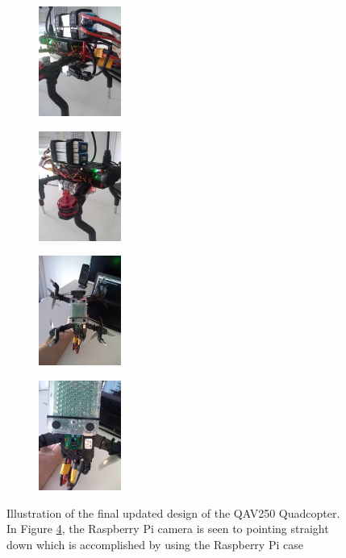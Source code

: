 \documentclass[../Head/report.tex]{subfiles}
\begin{document}
\begin{figure}[H]
    \centering
    \begin{subfigure}[b]{.20\textwidth}
        \centering
        \includegraphics[height=3.6cm]{../Figures/drone/drone_close1.jpg}
        \caption{}
        \label{fig:drone_close_one}
    \end{subfigure}
    \begin{subfigure}[b]{.20\textwidth}
        \centering
        \includegraphics[height=3.6cm]{../Figures/drone/drone_close2.jpg}
        \caption{}
        \label{fig:drone_close_two}
    \end{subfigure}
    \begin{subfigure}[b]{.20\textwidth}
        \centering
        \includegraphics[height=3.6cm]{../Figures/drone/drone_bottom.jpg}
        \caption{}
        \label{fig:drone_bottom}
    \end{subfigure}
    \begin{subfigure}[b]{.20\textwidth}
        \centering
        \includegraphics[height=3.6cm]{../Figures/drone/drone_bottom_zoom.jpg}
        \caption{}
        \label{fig:drone_bottom_zoom}
    \end{subfigure}
    \caption{Illustration of the final updated design of the QAV250 Quadcopter. In Figure \ref{fig:drone_bottom_zoom}, the Raspberry Pi camera is seen to pointing straight down which is accomplished by using the Raspberry Pi case}
    \label{fig:drone_two}
\end{figure}
\end{document}
